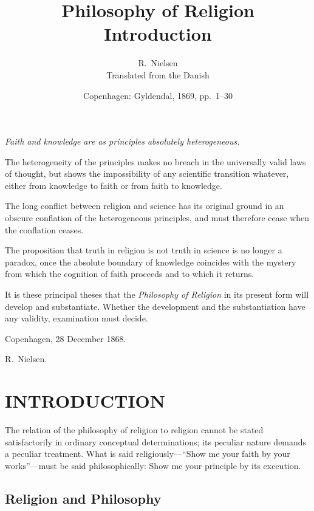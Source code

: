 \documentclass[12pt,a4paper]{article}
\title{\textbf{Philosophy of Religion}\\[6pt]
  \large Introduction}
\author{R.\ Nielsen\\[4pt]
  \small Translated from the Danish}
\date{Copenhagen: Gyldendal, 1869, pp.\ 1--30}
\begin{document}
\maketitle
\thispagestyle{fancy}

\bigskip

\begin{center}
\itshape
Faith and knowledge are as principles absolutely heterogeneous.

\smallskip

The heterogeneity of the principles makes no breach in the
universally valid laws of thought, but shows the impossibility
of any scientific transition whatever, either from knowledge to
faith or from faith to knowledge.

\smallskip

The long conflict between religion and science has its original
ground in an obscure conflation of the heterogeneous principles,
and must therefore cease when the conflation ceases.

\smallskip

The proposition that truth in religion is not truth in science
is no longer a paradox, once the absolute boundary of knowledge
coincides with the mystery from which the cognition of faith
proceeds and to which it returns.

\smallskip

It is these principal theses that the \emph{Philosophy of
Religion} in its present form will develop and substantiate.
Whether the development and the substantiation have any
validity, examination must decide.

\bigskip
Copenhagen, 28 December 1868.

R.\ Nielsen.
\end{center}

\bigskip\bigskip

\section*{INTRODUCTION}

The relation of the philosophy of religion to religion cannot be
stated satisfactorily in ordinary conceptual determinations; its
peculiar nature demands a peculiar treatment. What is said
religiously---``Show me your faith by your works''---must be
said philosophically: Show me your principle by its execution.

\subsection*{Religion and Philosophy}
\end{document}
